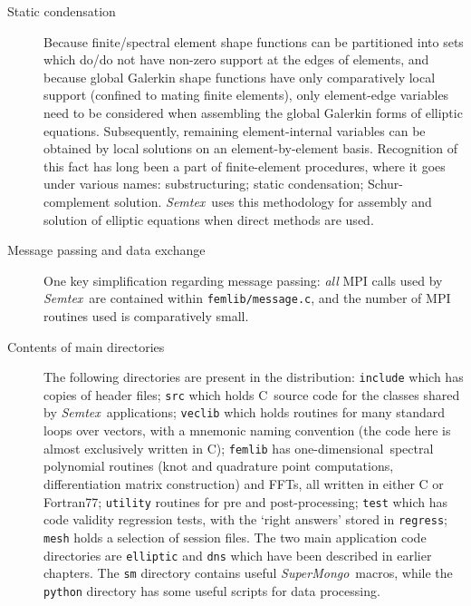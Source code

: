 \documentclass[11pt]{report}
\newcommand{\Semtex}{\emph{Semtex}} \newcommand{\Dog}{\emph{Dog}}
\newcommand{\SM}{\emph{SuperMongo}}
\newcommand\oned{one-di\-men\-sion\-al}
\newcommand\cpp{C\nolinebreak\hspace{-.05em}\raisebox{.3ex}{\footnotesize\bf
+}\nolinebreak\hspace{-.10em}\raisebox{.3ex}{\footnotesize\bf+}}
\begin{document}
\begin{description}
\item[Static condensation] Because finite/spectral element shape
  functions can be partitioned into sets which do/do not have non-zero
  support at the edges of elements, and because global Galerkin shape
  functions have only comparatively local support (confined to mating
  finite elements), only element-edge variables need to be considered
  when assembling the global Galerkin forms of elliptic equations.
  Subsequently, remaining element-internal variables can be obtained by
  local solutions on an element-by-element basis.  Recognition of this
  fact has long been a part of finite-element procedures, where it
  goes under various names: substructuring; static condensation;
  Schur-complement solution.  \Semtex\ uses this methodology for
  assembly and solution of elliptic equations when direct methods are
  used.


  
\item[Message passing and data exchange] One key simplification
  regarding message passing: \emph{all} MPI calls used by \Semtex\ are
  contained within \verb|femlib/message.c|, and the number of MPI
  routines used is comparatively small.

\item[Contents of main directories] The following directories are
  present in the distribution: \verb|include| which has copies of
  header files; \verb|src| which holds \cpp\ source code for the
  classes shared by \Semtex\ applications; \verb|veclib| which holds
  routines for many standard loops over vectors, with a mnemonic
  naming convention (the code here is almost exclusively written in
  C); \verb|femlib| has \oned\ spectral polynomial routines (knot and
  quadrature point computations, differentiation matrix construction)
  and FFTs, all written in either C or Fortran77; \verb|utility|
  routines for pre and post-processing; \verb|test| which has code
  validity regression tests, with the `right answers' stored in
  \verb|regress|; \verb|mesh| holds a selection of session files.  The
  two main application code directories are \verb|elliptic| and
  \verb|dns| which have been described in earlier chapters.  The
  \verb|sm| directory contains useful \SM\ macros, while the
  \verb|python| directory has some useful scripts for data processing.
  
\end{description}
\end{document}
